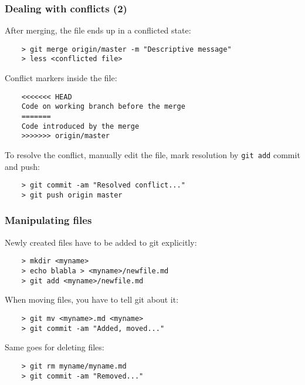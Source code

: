 \begin{frame}[fragile]
	\frametitle{Dealing with conflicts (2)}
	
	After merging, the file ends up in a conflicted state:
	\begin{verbatim}
	> git merge origin/master -m "Descriptive message"
	> less <conflicted file>	
	\end{verbatim}	
	
	Conflict markers inside the file:
	\begin{verbatim}
	<<<<<<< HEAD
	Code on working branch before the merge
	=======
	Code introduced by the merge
	>>>>>>> origin/master
	\end{verbatim}

	To resolve the conflict, manually edit the file, mark resolution by \texttt{git add} commit and push:
	\begin{verbatim}
	> git commit -am "Resolved conflict..."
	> git push origin master
	\end{verbatim}
	
\end{frame}




\begin{frame}[fragile]
	\frametitle{Manipulating files}
	
	Newly created files have to be added to git explicitly:
	\begin{verbatim}
	> mkdir <myname>
	> echo blabla > <myname>/newfile.md
	> git add <myname>/newfile.md
	\end{verbatim}
	
	When moving files, you have to tell git about it:
	\begin{verbatim}
	> git mv <myname>.md <myname>
	> git commit -am "Added, moved..."	
	\end{verbatim}
	
	Same goes for deleting files:
	\begin{verbatim}
	> git rm myname/myname.md
	> git commit -am "Removed..."
	\end{verbatim}
	
	\begin{verbatim}
	
	\end{verbatim}
	
\end{frame}

